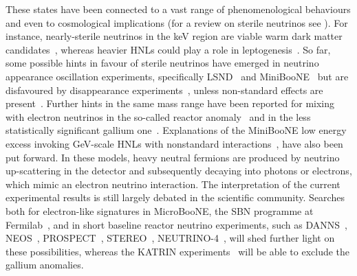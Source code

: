 These states have been connected to a vast range of phenomenological behaviours and %
even to cosmological implications (for a review on sterile neutrinos see ).
For instance, nearly-sterile neutrinos in the keV region are viable warm dark matter candidates~\cite{Asaka:2005an}, %
whereas heavier HNLs could play a role in leptogenesis~\cite{Fukugita:1986hr, Covi:1996wh, Pilaftsis:1997jf}.
So far, some possible hints in favour of sterile neutrinos have emerged in neutrino appearance oscillation experiments, %
specifically LSND~\cite{Aguilar:2001ty} and MiniBooNE~\cite{Aguilar-Arevalo:2012fmn, Aguilar-Arevalo:2013pmq, Aguilar-Arevalo:2018gpe} %
but are disfavoured by disappearance experiments~\cite{TheIceCube:2016oqi, Adamson:2017uda, Aartsen:2017bap}, %
unless non-standard effects are present~\cite{Liao:2016reh, Liao:2018mbg, Esmaili:2018qzu, Denton:2018dqq}.
Further hints in the same mass range have been reported for mixing with electron neutrinos in the %
so-called reactor anomaly~\cite{Mueller:2011nm, Mention:2011rk, Huber:2011wv, Ko:2016owz, Alekseev:2018efk} %
and in the less statistically significant gallium one~\cite{Abdurashitov:2005tb, Laveder:2007zz, Giunti:2006bj}.
Explanations of the MiniBooNE low energy excess invoking GeV-scale HNLs with nonstandard %
interactions~\cite{Gninenko:2009ks, Gninenko:2010pr, Masip:2012ke, Bertuzzo:2018itn, Ballett:2018ynz}, %
have also been put forward.
In these models, heavy neutral fermions are produced by neutrino up-scattering in the detector %
and subsequently decaying into photons or electrons, which mimic an electron neutrino interaction.
The interpretation of the current experimental results is still largely debated in the scientific community.
Searches both for electron-like signatures in MicroBooNE, the SBN programme at Fermilab~\cite{Antonello:2015lea}, %
and in short baseline reactor neutrino experiments, such as DANNS~\cite{Alekseev:2018efk}, NEOS~\cite{Ko:2016owz}, %
PROSPECT~\cite{Ashenfelter:2018iov}, STEREO~\cite{Almazan:2018wln}, \mbox{NEUTRINO-4}~\cite{Serebrov:2018vdw}, %
will shed further light on these possibilities, %
whereas the KATRIN experiments~\cite{Mertens:2018vuu} will be able to exclude the gallium anomalies.

